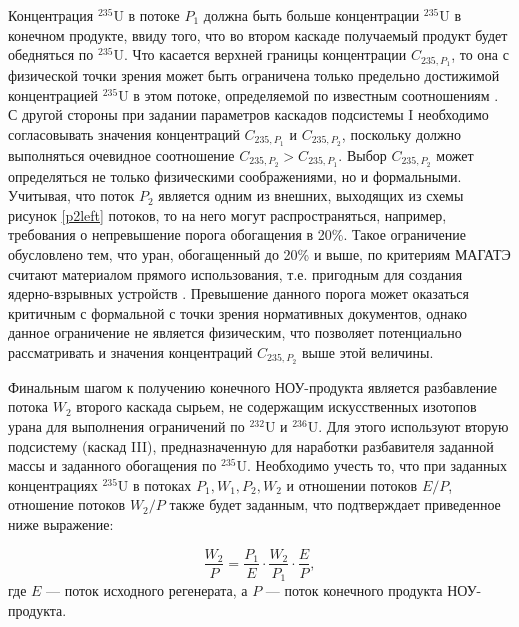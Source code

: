 Концентрация $^{235}$U в потоке $P_1$ должна быть больше концентрации $^{235}$U в конечном продукте, ввиду того, что во втором каскаде получаемый продукт будет обедняться по $^{235}$U. Что касается верхней границы концентрации ${C}_{235,{P_1}}$, то она с физической точки зрения может быть ограничена только предельно достижимой концентрацией $^{235}$U в этом потоке, определяемой по известным соотношениям \cite{minenkoPredelnoeObogashcheniePromezhutochnyh1972,sulaberidzeOsobennostiObogashcheniyaKomponentov2006}. С другой стороны при задании параметров каскадов подсистемы I необходимо согласовывать значения концентраций ${C}_{235,{P_1}}$ и ${C}_{235,{P_2}}$, поскольку должно выполняться очевидное соотношение ${C}_{235,{P_2}}{>}{C}_{235,{P_1}}$.
Выбор $C_{235,{P_2}}$ может определяться не только физическими соображениями, но и формальными. Учитывая, что поток $P_2$ является одним из внешних, выходящих из схемы рисунок \ref{p2left} потоков, то на него могут распространяться, например, требования о непревышение порога обогащения в 20\%. Такое ограничение обусловлено тем, что уран, обогащенный до 20\% и выше, по критериям МАГАТЭ считают материалом прямого использования, т.е. пригодным для создания ядерно-взрывных устройств \cite{brownOriginsSignificanceLimit2016,pshakinYadernoeNerasprostranenie2006}. Превышение данного порога может оказаться критичным с формальной с точки зрения нормативных документов, однако данное ограничение не является физическим, что позволяет потенциально рассматривать и значения концентраций  $C_{235,{P_2}}$ выше этой величины. 

Финальным шагом к получению конечного НОУ-продукта является разбавление потока $W_2$ второго каскада сырьем, не содержащим искусственных изотопов урана для выполнения ограничений по $^{232}$U и $^{236}$U.
Для этого используют вторую подсистему (каскад III), предназначенную для наработки разбавителя заданной массы и заданного обогащения по $^{235}$U.
Необходимо учесть то, что при заданных концентрациях $^{235}$U в потоках ${P_1}, {W_1}, {P_2}, {W_2}$ и отношении потоков $E/P$, отношение потоков ${W_2}{/P}$ также будет заданным, что подтверждает приведенное ниже выражение:

\begin{equation}
    \label{dc1}
    \frac{W_{2}}{P}=\frac{P_{1}}{E}\cdot\frac{W_{2}}{P_{1}}\cdot\frac{E}{P},
\end{equation}
где $E$ --- поток исходного регенерата, а $P$ --- поток конечного продукта НОУ-продукта.

